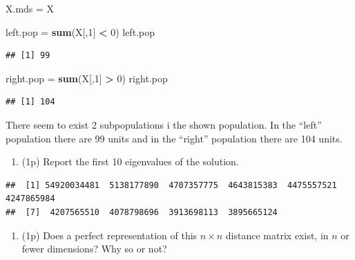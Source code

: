 \documentclass[
]{article}
\newenvironment{Shaded}{\begin{snugshade}}{\end{snugshade}}
\newcommand{\DecValTok}[1]{\textcolor[rgb]{0.00,0.00,0.81}{#1}}
\newcommand{\KeywordTok}[1]{\textcolor[rgb]{0.13,0.29,0.53}{\textbf{#1}}}
\newcommand{\NormalTok}[1]{#1}
\newcommand{\OperatorTok}[1]{\textcolor[rgb]{0.81,0.36,0.00}{\textbf{#1}}}
\newcommand{\StringTok}[1]{\textcolor[rgb]{0.31,0.60,0.02}{#1}}
\providecommand{\tightlist}{%
  \setlength{\itemsep}{0pt}\setlength{\parskip}{0pt}}
\begin{document}
\begin{Shaded}
\begin{Highlighting}[]
\NormalTok{X.mds =}\StringTok{ }\NormalTok{X}

\NormalTok{left.pop =}\StringTok{ }\KeywordTok{sum}\NormalTok{(X[,}\DecValTok{1}\NormalTok{] }\OperatorTok{<}\StringTok{ }\DecValTok{0}\NormalTok{)}
\NormalTok{left.pop}
\end{Highlighting}
\end{Shaded}

\begin{verbatim}
## [1] 99
\end{verbatim}

\begin{Shaded}
\begin{Highlighting}[]
\NormalTok{right.pop =}\StringTok{ }\KeywordTok{sum}\NormalTok{(X[,}\DecValTok{1}\NormalTok{] }\OperatorTok{>}\StringTok{ }\DecValTok{0}\NormalTok{)}
\NormalTok{right.pop}
\end{Highlighting}
\end{Shaded}

\begin{verbatim}
## [1] 104
\end{verbatim}

There seem to exist 2 subpopulations i the shown population. In the
``left'' population there are 99 units and in the ``right'' population
there are 104 units.

\begin{enumerate}
\def\labelenumi{\arabic{enumi}.}
\setcounter{enumi}{4}
\tightlist
\item
  (1p) Report the first 10 eigenvalues of the solution.
\end{enumerate}

\begin{Shaded}
\end{Shaded}

\begin{verbatim}
##  [1] 54920034481  5138177890  4707357775  4643815383  4475557521  4247865984
##  [7]  4207565510  4078798696  3913698113  3895665124
\end{verbatim}

\begin{enumerate}
\def\labelenumi{\arabic{enumi}.}
\setcounter{enumi}{5}
\tightlist
\item
  (1p) Does a perfect representation of this \(n \times n\) distance
  matrix exist, in \(n\) or fewer dimensions? Why so or not?
\end{enumerate}
\end{document}

